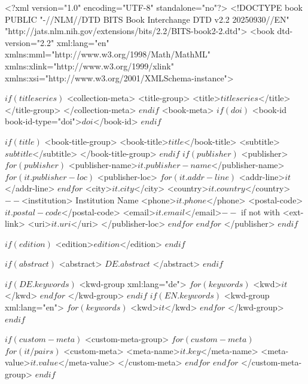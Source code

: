 <?xml version="1.0" encoding="UTF-8" standalone="no"?>
<!DOCTYPE book PUBLIC "-//NLM//DTD BITS Book Interchange DTD v2.2 20250930//EN" "http://jats.nlm.nih.gov/extensions/bits/2.2/BITS-book2-2.dtd">
<book
    dtd-version="2.2" xml:lang="en" 
    xmlns:mml="http://www.w3.org/1998/Math/MathML" 
    xmlns:xlink="http://www.w3.org/1999/xlink" 
    xmlns:xsi="http://www.w3.org/2001/XMLSchema-instance">

    $if(titleseries)$
    <collection-meta>
        <title-group>
            <title>$titleseries$</title>
        </title-group>
    </collection-meta>
    $endif$
    <book-meta>
        $if(doi)$
        <book-id book-id-type="doi">$doi$</book-id>
        $endif$

        $if(title)$
        <book-title-group>
            <book-title>$title$</book-title>
            <subtitle>$subtitle$</subtitle>
        </book-title-group>
        $endif$
        $if(publisher)$
        <publisher>
        $for(publisher)$
            <publisher-name>$it.publisher-name$</publisher-name>
            $for(it.publisher-loc)$
            <publisher-loc>
                $for(it.addr-line)$
                <addr-line>$it$</addr-line>
                $endfor$
                <city>$it.city$</city>
                <country>$it.country$</country>
                $--  $<institution> Institution Name
                <phone>$it.phone$</phone>
                <postal-code>$it.postal-code$</postal-code>
                <email>$it.email$</email>$-- $ if not with <ext-link>
                <uri>$it.uri$</uri>
            </publisher-loc>
            $endfor$
        $endfor$
        </publisher>
        $endif$

        $if(edition)$
        <edition>$edition$</edition>
        $endif$

        $if(abstract)$
        <abstract>
        $DE.abstract$
        </abstract>
        $endif$

        $if(DE.keywords)$
        <kwd-group xml:lang="de">
            $for(keywords)$
            <kwd>$it$</kwd>
            $endfor$
        </kwd-group>
        $endif$
        $if(EN.keywords)$
        <kwd-group xml:lang="en">
            $for(keywords)$
            <kwd>$it$</kwd>
            $endfor$
        </kwd-group>
        $endif$
            

        $if(custom-meta)$
        <custom-meta-group>
            $for(custom-meta)$
            $for(it/pairs)$
                <custom-meta>
                    <meta-name>$it.key$</meta-name>
                    <meta-value>$it.value$</meta-value>
                </custom-meta>
            $endfor$
            $endfor$
        </custom-meta-group>
        $endif$


